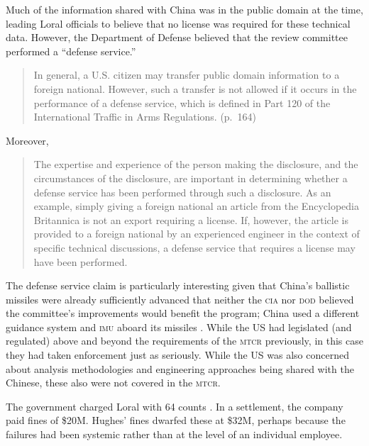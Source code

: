 \documentclass[12pt]{olfmemo}
\begin{document}
Much of the information shared with China was in the public domain at the time, leading Loral officials to believe that no license was required for these technical data. However, the Department of Defense believed that the review committee performed a ``defense service.''
\begin{quote}
In general, a U.S. citizen may transfer public domain information to a foreign national. However, such a transfer is not allowed if it occurs in the performance of a defense service, which is defined in Part 120 of the International Traffic in Arms Regulations. (p.~164)
\end{quote}
Moreover,
\begin{quote}
The expertise and experience of the person making the disclosure, and the circumstances of the disclosure, are important in determining whether a defense service has been performed through such a disclosure. As an example, simply giving a foreign national an article from the Encyclopedia Britannica is not an export requiring a license. If, however, the article is provided to a foreign national by an experienced engineer in the context of specific technical discussions, a defense service that requires a license may have been performed. \cite{Cox1999}
\end{quote}

The defense service claim is particularly interesting given that China's ballistic missiles were already sufficiently advanced that neither the \textsc{cia} nor \textsc{dod} believed the committee's improvements would benefit the program; China used a different guidance system and \textsc{imu} aboard its missiles \citep{Cox1999}. While the US had legislated (and regulated) above and beyond the requirements of the \textsc{mtcr} previously, in this case they had taken enforcement just as seriously. While the US was also concerned about analysis methodologies and engineering approaches being shared with the Chinese, these also were not covered in the \textsc{mtcr}.

The government charged Loral with 64 counts \citep{Marquis2002}. In a settlement, the company paid fines of \$20M. Hughes' fines dwarfed these at \$32M, perhaps because the failures had been systemic rather than at the level of an individual employee.
\end{document}
